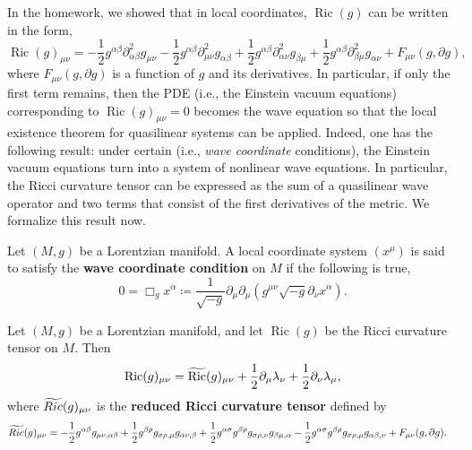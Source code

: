 \documentclass{article}
\begin{document}
In the homework, we showed that in local coordinates, $\operatorname{Ric}(g)$ can be written in the form, 
\begin{equation*}
	\operatorname{Ric}(g)_{\mu\nu} = -\frac{1}{2}g^{\alpha \beta}\partial^{2}_{\alpha\beta}g_{\mu\nu} - \frac{1}{2}g^{\alpha\beta}\partial^{2}_{\mu\nu} g_{\alpha\beta} + \frac{1}{2}g^{\alpha\beta}\partial^{2}_{\alpha \nu}g_{\beta \mu} + \frac{1}{2}g^{\alpha\beta}\partial^{2}_{\beta\mu}g_{\alpha\nu} + F_{\mu\nu}(g, \partial g), 
\end{equation*}
where $F_{\mu\nu}(g, \partial g)$ is a function of $g$ and its derivatives. In particular, if only the first term remains, then the PDE (i.e., the Einstein vacuum equations) corresponding to $\operatorname{Ric}(g)_{\mu\nu} = 0$ becomes the wave equation so that the local existence theorem for quasilinear systems can be applied. Indeed, one has the following result: under certain (i.e., \textit{wave coordinate} conditions), the Einstein vacuum equations turn into a system of nonlinear wave equations. In particular, the Ricci curvature tensor can be expressed as the sum of a quasilinear wave operator and two terms that consist of the first derivatives of the metric. We formalize this result now. 
\begin{definition}
	Let $(M, g)$ be a Lorentzian manifold. A local coordinate system $(x^{\mu})$ is said to satisfy the \textbf{wave coordinate condition} on $M$ if the following is true, 
	\begin{equation*}
		0 = \Box_{g}x^{\alpha} \coloneqq \frac{1}{\sqrt{-g}}\partial_{\mu}\partial_{\mu}(g^{\mu\nu}\sqrt{-g}\partial_{\nu}x^{\alpha}). 
	\end{equation*}
\end{definition} 
\begin{prop}
	Let $(M, g)$ be a Lorentzian manifold, and let $\operatorname{Ric}(g)$ be the Ricci curvature tensor on $M$. Then 
	\begin{equation*}
		\operatorname{Ric}(g)_{\mu\nu} = \widetilde{\operatorname{Ric}}(g)_{\mu\nu} + \frac{1}{2}\partial_{\mu}\lambda_{\nu} + \frac{1}{2}\partial_{\nu}\lambda_{\mu}, 
	\end{equation*} 
	where $\widetilde{Ric}(g)_{\mu\nu}$ is the \textbf{reduced Ricci curvature tensor} defined by 
	\begin{align*}
		\begin{split} 
			\widetilde{Ric}(g)_{\mu\nu} &= -\frac{1}{2}g^{\alpha\beta}g_{\mu\nu,\alpha\beta} + \frac{1}{2}g^{\beta\rho}g_{\sigma\rho,\mu}g_{\alpha\nu,\beta} + \frac{1}{2}g^{\alpha\sigma}g^{\beta \rho}g_{\sigma\rho,\nu}g_{\beta\mu,\alpha}- \frac{1}{2}g^{\alpha\sigma}g^{\beta\rho}g_{\sigma\rho,\mu}g_{\alpha\beta,\nu} + F_{\mu\nu}(g,\partial g). 
		\end{split} 
	\end{align*} 
\end{prop}  
\end{document}
